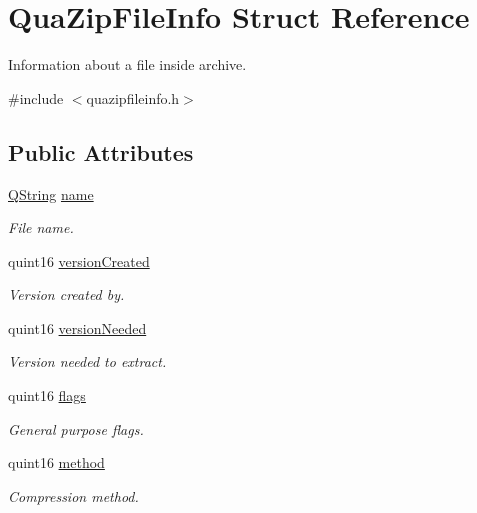 \hypertarget{struct_qua_zip_file_info}{\section{Qua\-Zip\-File\-Info Struct Reference}
\label{struct_qua_zip_file_info}
}


Information about a file inside archive.  




{\ttfamily \#include $<$quazipfileinfo.\-h$>$}

\subsection*{Public Attributes}
\begin{DoxyCompactItemize}
\item 
\hyperlink{group___u_a_v_objects_plugin_gab9d252f49c333c94a72f97ce3105a32d}{Q\-String} \hyperlink{struct_qua_zip_file_info_a16ac323965deccf0232bfae69d933a84}{name}
\begin{DoxyCompactList}\small\item\em File name. \end{DoxyCompactList}\item 
quint16 \hyperlink{struct_qua_zip_file_info_a52f3f1d960ebaa2acbc2a86458fa3e6e}{version\-Created}
\begin{DoxyCompactList}\small\item\em Version created by. \end{DoxyCompactList}\item 
quint16 \hyperlink{struct_qua_zip_file_info_a8b73982808bded49e88e624a65e1a94f}{version\-Needed}
\begin{DoxyCompactList}\small\item\em Version needed to extract. \end{DoxyCompactList}\item 
quint16 \hyperlink{struct_qua_zip_file_info_a56d36f777e4fc892c71e22d080622e2c}{flags}
\begin{DoxyCompactList}\small\item\em General purpose flags. \end{DoxyCompactList}\item 
quint16 \hyperlink{struct_qua_zip_file_info_af5c1bbda7f5dec2c358e7a543564de4c}{method}
\begin{DoxyCompactList}\small\item\em Compression method. \end{DoxyCompactList}\item 

\end{DoxyCompactItemize}
